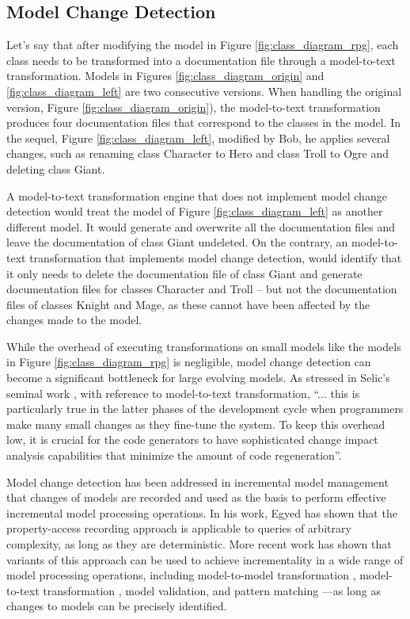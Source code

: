 \subsection{Model Change Detection}
\label{sec:model_change_detection}
Let's say that after modifying the model in Figure \ref{fig:class_diagram_rpg}, each class needs to be transformed into a documentation file through a model-to-text transformation. Models in Figures \ref{fig:class_diagram_origin} and \ref{fig:class_diagram_left} are two consecutive versions. When handling the original version, Figure \ref{fig:class_diagram_origin}), the model-to-text transformation produces four documentation files that correspond to the classes in the model. In the sequel, Figure \ref{fig:class_diagram_left}, modified by Bob, he applies several changes, such as renaming class \textsf{Character} to \textsf{Hero} and class \textsf{Troll} to \textsf{Ogre} and deleting class \textsf{Giant}.

A model-to-text transformation engine that does not implement model change detection would treat the model of Figure \ref{fig:class_diagram_left} as another different model. It would generate 
and overwrite all the documentation files and leave the documentation of class \textsf{Giant} undeleted. On the contrary, an model-to-text transformation that implements model change detection, would identify that it only needs to delete the documentation file of class \textsf{Giant} and generate documentation files for classes \textsf{Character} and \textsf{Troll} -- but not the documentation files of classes \textsf{Knight} and \textsf{Mage}, as these cannot have been affected by the changes made to the model.

While the overhead of executing transformations on small models like the models in Figure \ref{fig:class_diagram_rpg} is negligible, model change detection can become a significant bottleneck for large evolving models. As stressed in Selic's seminal work \cite{selic2003pragmatics}, with reference to model-to-text transformation, ``... \textsf{this is particularly true in the latter phases of the development cycle when programmers make many small changes as they fine-tune the system. To keep this overhead low, it is crucial for the code generators to have sophisticated change impact analysis capabilities that minimize the amount of code regeneration}''.

Model change detection has been addressed in incremental model management that changes of models are recorded and used as the basis to perform effective incremental model processing operations. In his work, Egyed \cite{egyed2011automatically} has shown that the property-access recording approach is applicable to queries of arbitrary complexity, as long as they are deterministic. More recent work has shown that variants of this approach can be used to achieve incrementality in a wide range of model processing operations, including model-to-model transformation \cite{jouault2010towards}, model-to-text transformation \cite{DBLP:conf/ecmdafa/OgunyomiRK15}, model validation, and pattern matching \cite{DBLP:conf/ecmdafa/RathHV12}---as long as changes to models can be precisely identified.

